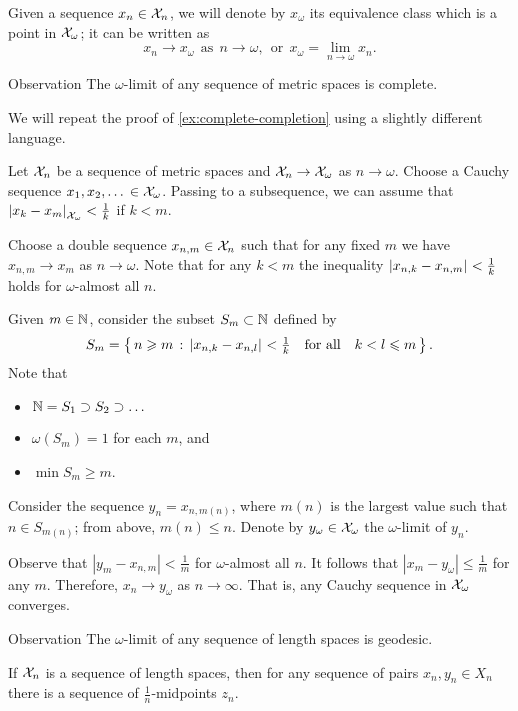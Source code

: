 Given a sequence $x_n\in \mathcal{X}_n$,
we will denote by $x_\omega$ its equivalence class which is a point in $\mathcal{X}_\omega$;
it can be written as
\[x_n\to x_\omega \ \ \text{as}\ \  n\to\omega,\ \ \text{or}\ \ x_\omega=\lim_{n\to\omega} x_n.\]

\begin{thm}{Observation}\label{obs:ultralimit-is-complete}
The $\omega$-limit of any sequence of metric spaces is complete. 
\end{thm}

We will repeat the proof of \ref{ex:complete-completion} using a slightly different language.

Let $\mathcal{X}_n$ be a sequence of metric spaces and $\mathcal{X}_n\to\mathcal{X}_\omega$ as $n\to\omega$.
Choose a Cauchy sequence $x_1,x_2,\dots{}\in\mathcal{X}_\omega$.
Passing to a subsequence, we can assume that $\dist{x_k}{x_{m}}{\spc{X}_\omega}<\tfrac1{k}$ if $k<m$.

Choose a double sequence $x_{n,m}\in \mathcal{X}_n$ such that for any fixed $m$ we have $x_{n,m}\to x_m$ as $n\to\omega$.
Note that for any $k<m$ the inequality $\dist{x_{n,k}}{x_{n,m}}{}<\tfrac1{k}$ holds for $\omega$-almost all $n$.

Given $m\in\mathbb{N}$, consider the subset $S_m\subset\mathbb{N}$ defined by
\[S_m=\set{n\ge m}{\dist{x_{n,k}}{x_{n,l}}{}<\tfrac1{k} \quad\text{for all}\quad k<l\le m}.\]
Note that 
\begin{itemize}
\item $\mathbb{N}= S_1\supset S_2\supset\dots$
\item $\omega(S_m)=1$ for each $m$, and
\item $\min S_m\ge m$.
\end{itemize}

Consider the sequence $y_n=x_{n,m(n)}$, where $m(n)$ is the largest value such that $n\in S_{m(n)}$;
from above, $m(n)\le n$.
Denote by $y_\omega\in \mathcal{X}_\omega$ the $\omega$-limit of $y_n$.

Observe that $|y_m-x_{n,m}|<\tfrac1{m}$ for $\omega$-almost all $n$.
It follows that $|x_m-y_\omega|\le \tfrac1{m}$ for any $m$.
Therefore, $x_n\to y_\omega$ as $n\to \infty$.
That is, any Cauchy sequence in $\mathcal{X}_\omega$ converges.
\qeds

\begin{thm}{Observation}\label{obs:ultralimit-is-geodesic}
The $\omega$-limit of any sequence of length spaces is geodesic. 
\end{thm}

If $\mathcal{X}_n$ is a sequence of length spaces, then for any sequence of pairs $x_n, y_n\in X_n$ there is a sequence of $\tfrac1n$-midpoints $z_n$.


